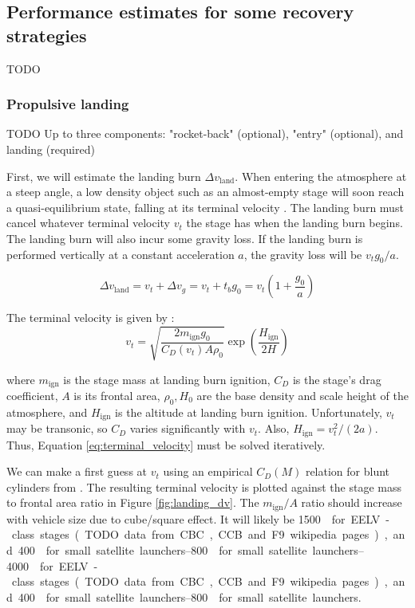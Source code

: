 \documentclass[conf]{new-aiaa}
\begin{document}
\subsection{Performance estimates for some recovery strategies}
TODO

\subsubsection{Propulsive landing}
TODO
Up to three components: "rocket-back" (optional), "entry" (optional), and landing (required)

First, we will estimate the landing burn $\Delta v_{\mathrm{land}}$. When entering the atmosphere at a steep angle, a low density object such as an almost-empty stage will soon reach a quasi-equilibrium state, falling at its terminal velocity \cite{Wiesel2010}. The landing burn must cancel whatever terminal velocity $v_t$ the stage has when the landing burn begins. The landing burn will also incur some gravity loss. If the landing burn is performed vertically at a constant acceleration $a$, the gravity loss will be $v_t g_0 / a$.

\begin{equation}
\Delta v_{\mathrm{land}} = v_t + \Delta v_{g} = v_t + t_b g_0 = v_t(1 + \frac{g_0}{a})
\end{equation}

The terminal velocity is given by \cite{Wiesel2010}:
\begin{equation}
\label{eq:terminal_velocity}
v_t = \sqrt{\frac{2 m_{\mathrm{ign}} g_0}{C_D(v_t) A \rho_{0}}} \exp\left( \frac{H_\mathrm{ign}}{2H} \right)
\end{equation}

where $m_{\mathrm{ign}}$ is the stage mass at landing burn ignition, $C_D$ is the stage's drag coefficient, $A$ is its frontal area, $\rho_0, H_0$ are the base density and scale height of the atmosphere, and $H_\mathrm{ign}$ is the altitude at landing burn ignition. Unfortunately, $v_t$ may be transonic, so $C_D$ varies significantly with $v_t$. Also, $H_\mathrm{ign} = v_t^2 / (2 a)$.  Thus, Equation \ref{eq:terminal_velocity} must be solved iteratively.

We can make a first guess at $v_t$ using an empirical $C_D(M)$ relation for blunt cylinders from \cite{Hoerner1965}. The resulting terminal velocity is plotted against the stage mass to frontal area ratio in Figure \ref{fig:landing_dv}. The $m_{\mathrm{ign}}/A$ ratio should increase with vehicle size due to cube/square effect. It will likely be \SIrange{1500}{4000}{\kilogram\per\meter\square} for EELV-class stages (TODO data from CBC, CCB and F9 wikipedia pages), and \SIrange{400}{800}{\kilogram\per\meter\square} for small satellite launchers.
\end{document}
